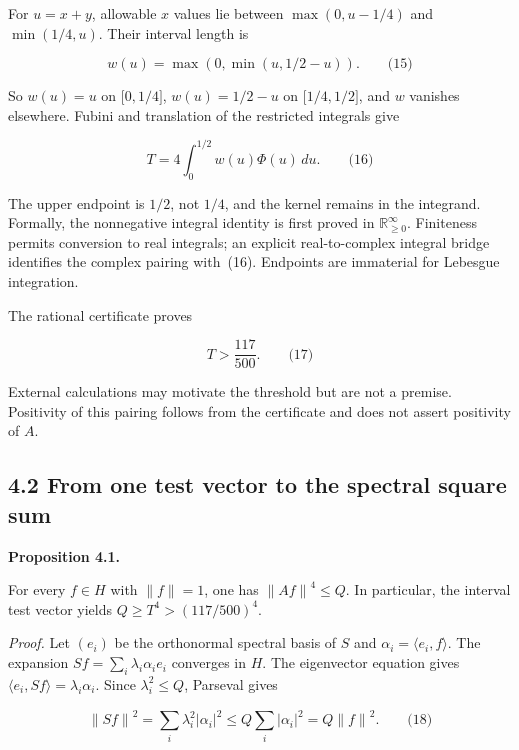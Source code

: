 \documentclass[
  11pt,
]{article}
\begin{document}
For \(u = x + y\), allowable \(x\) values lie between \(\max(0,u - 1/4)\) and \(\min(1/4,u)\). Their interval length is

\[w(u) = \max\left( 0,\min(u,1/2 - u) \right).\quad\quad\text{(15)}\]

So \(w(u) = u\) on \(\lbrack 0,1/4\rbrack\), \(w(u) = 1/2 - u\) on \(\lbrack 1/4,1/2\rbrack\), and \(w\) vanishes elsewhere. Fubini and translation of the restricted integrals give

\[T = 4\int_{0}^{1/2}w(u)\Phi(u)\, du.\quad\quad\text{(16)}\]

The upper endpoint is \(1/2\), not \(1/4\), and the kernel remains in the integrand. Formally, the nonnegative integral identity is first proved in \(\mathbb{R}_{\geq 0}^{\infty}\). Finiteness permits conversion to real integrals; an explicit real-to-complex integral bridge identifies the complex pairing with~(16). Endpoints are immaterial for Lebesgue integration.

The rational certificate \texttt{} proves

\[T > \frac{117}{500}.\quad\quad\text{(17)}\]

External calculations may motivate the threshold but are not a premise. Positivity of this pairing follows from the certificate and does not assert positivity of \(A\).

\hypertarget{from-one-test-vector-to-the-spectral-square-sum}{%
\subsection{4.2 From one test vector to the spectral square sum}\label{from-one-test-vector-to-the-spectral-square-sum}}

\textbf{Proposition 4.1.}

For every \(f \in H\) with \(\parallel f \parallel = 1\), one has \({\parallel Af \parallel}^{4} \leq Q\). In particular, the interval test vector yields \(Q \geq T^{4} > (117/500)^{4}\).

\emph{Proof.} Let \(\left( e_{i} \right)\) be the orthonormal spectral basis of \(S\) and \(\alpha_{i} = \langle e_{i},f\rangle\). The expansion \(Sf = \sum_{i}^{}\lambda_{i}\alpha_{i}e_{i}\) converges in \(H\). The eigenvector equation gives \(\langle e_{i},Sf\rangle = \lambda_{i}\alpha_{i}\). Since \(\lambda_{i}^{2} \leq Q\), Parseval gives

\[{\parallel Sf \parallel}^{2} = \sum_{i}^{}\lambda_{i}^{2}\left| \alpha_{i} \right|^{2} \leq Q\sum_{i}^{}\left| \alpha_{i} \right|^{2} = Q{\parallel f \parallel}^{2}.\quad\quad\text{(18)}\]
\end{document}
